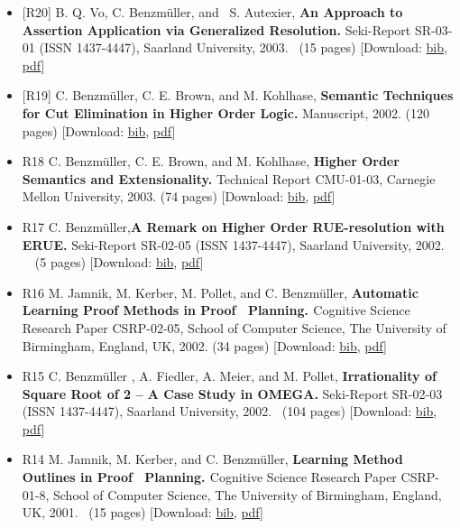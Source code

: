 \documentclass{article}
\newcommand{\tmtextbf}[1]{{\bfseries{#1}}}
\newenvironment{itemizedot}{\begin{itemize} \renewcommand{\labelitemi}{$\bullet$}\renewcommand{\labelitemii}{$\bullet$}\renewcommand{\labelitemiii}{$\bullet$}\renewcommand{\labelitemiv}{$\bullet$}}{\end{itemize}}
\begin{document}
\begin{itemizedot}
  \item {\small [R20] B. Q. Vo, C. Benzm\"uller, and \ S. Autexier,
  \tmtextbf{An Approach to Assertion Application via Generalized Resolution.}
  Seki-Report SR-03-01 (ISSN 1437-4447), Saarland University, 2003. \ (15
  pages)} {\color{grey} [Download: {\small \href{../papers/R20.bib}{bib},
  \href{../papers/R20.pdf}{pdf}}]}
  
  \item {\small [R19] C. Benzm\"uller, C. E. Brown, and M. Kohlhase,
  \tmtextbf{Semantic Techniques for Cut Elimination in Higher Order Logic.}}
  {\small Manuscript, 2002. (120 pages)} {\color{grey} [Download: {\small
  \href{../papers/R19.bib}{bib}, \href{../papers/R19.pdf}{pdf}}]}
  
  \item [R18] {\small C. Benzm\"uller, C. E. Brown, and M. Kohlhase,
  \tmtextbf{Higher Order Semantics and Extensionality.}} {\small Technical
  Report CMU-01-03, Carnegie Mellon University, 2003. (74 pages)}
  {\color{grey} [Download: {\small \href{../papers/R18.bib}{bib},
  \href{../papers/R18.pdf}{pdf}}]}
  
  \item [R17] C. Benzm\"uller,{\small  \tmtextbf{A Remark on Higher Order
  RUE-resolution with ERUE.} Seki-Report SR-02-05 (ISSN 1437-4447), Saarland
  University, 2002. \ \ (5 pages)} {\color{grey} [Download: {\small
  \href{../papers/R17.bib}{bib}, \href{../papers/R17.pdf}{pdf}}]}
  
  \item [R16] {\small M. Jamnik, M. Kerber, M. Pollet, and C. Benzm\"uller,
  \tmtextbf{Automatic Learning Proof Methods in Proof \ Planning. }Cognitive
  Science Research Paper CSRP-02-05, School of Computer Science, The
  University of Birmingham, England, UK, 2002. (34 pages)} {\color{grey}
  [Download: {\small \href{../papers/R16.bib}{bib},
  \href{../papers/R16.pdf}{pdf}}]}
  
  \item [R15] {\small C. Benzm\"uller , A. Fiedler, A. Meier, and M. Pollet,
  \tmtextbf{Irrationality of Square Root of 2 -- A Case Study in OMEGA.}}
  {\small Seki-Report SR-02-03 (ISSN 1437-4447), Saarland University, 2002. \
  (104 pages)} {\color{grey} [Download: {\small \href{../papers/R15.bib}{bib},
  \href{../papers/R15.pdf}{pdf}}]}
  
  \item [R14] {\small M. Jamnik, M. Kerber, and C. Benzm\"uller,
  \tmtextbf{Learning Method Outlines in Proof \ Planning. }Cognitive Science
  Research Paper CSRP-01-8, School of Computer Science, The University of
  Birmingham, England, UK, 2001. \ (15 pages)} {\color{grey} [Download:
  {\small \href{../papers/R14.bib}{bib}, \href{../papers/R14.pdf}{pdf}}]}
  

\end{itemizedot}
\end{document}
